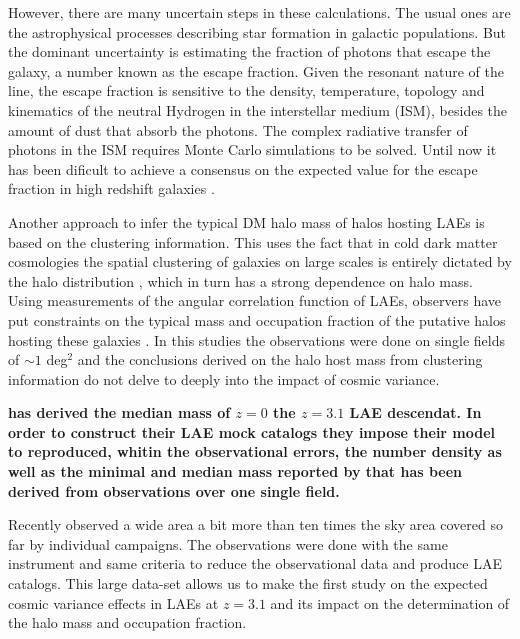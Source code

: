 \documentclass[usenatbib]{mn2e}
\newcommand{\ly}{{\ifmmode{{\rm Ly}\alpha}\else{Ly$\alpha$~}\fi}}
\begin{document}
However, there are many uncertain steps in these calculations. The
usual ones are the astrophysical processes describing star formation in galactic
populations. But the dominant uncertainty is estimating the
fraction of \ly photons that escape the galaxy, a number known as the escape
fraction. Given the resonant nature of the \ly line, the escape
fraction is sensitive to  the density, temperature, topology and
kinematics of the neutral Hydrogen in the interstellar medium
(ISM), besides the amount of dust that absorb the \ly photons. The
complex radiative transfer of \ly photons in the ISM requires Monte
Carlo simulations to be solved. Until now it has been dificult to
achieve a consensus on the expected value for the \ly escape fraction
in high redshift galaxies
\citep{Neufeld1991,Verhamme2006,ForeroRomero2011,Dijkstra2012,Laursen2013,Orsi2012}.  

Another approach to infer the typical DM halo mass of halos hosting
LAEs is based on the clustering information. This uses the fact that in cold
dark matter cosmologies the spatial clustering of galaxies on large
scales is entirely dictated by the halo distribution
\citep{Colberg00}, which in turn has a strong dependence on halo
mass. Using measurements of the angular correlation function of LAEs,
observers have put constraints on the typical mass and occupation
fraction of the putative halos hosting these galaxies
\citep{Hayashino2004,Gawiser07,Nilsson2007,Ouchi2010}. In this
studies the observations were done on single fields of $\sim 1$
deg$^{2}$ and the conclusions derived on the halo host mass from
clustering information do not delve to deeply into the impact of
cosmic variance.  

{\bf \cite{Soler2012} has derived the median mass of $z=0$ the $z=3.1$ LAE 
descendat.  In order to construct their  LAE mock catalogs 
they impose their model to reproduced, whitin the observational errors,
 the number density  as well as  the minimal and median mass reported 
 by \cite{Gawiser07} that has been derived from observations
 over one single field. }

Recently \cite{Yamada2012} observed a wide area a bit more than ten
times the sky area covered so far by individual campaigns. The
observations were done with the same instrument and same criteria to
reduce the observational data and produce LAE catalogs. This large
data-set allows us to make the first study on the expected cosmic
variance effects in LAEs at $z=3.1$ and its impact on the
determination of the halo mass and occupation fraction. 
\end{document}
